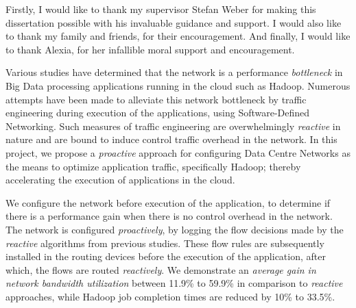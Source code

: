 \documentclass[hidelinks, a4paper, 12pt, oneside]{report}         %
\begin{document}


\thesistitlepage                                  %

\thesisdeclarationpage				  %

\thesispermissionpage				  %


\begin{thesisacknowledgments}                     %
Firstly, I would like to thank my supervisor Stefan Weber for making this dissertation possible with his invaluable guidance and support. I would also like to thank my family and friends, for their encouragement. And finally, I would like to thank Alexia, for her infallible moral support and encouragement.  

\end{thesisacknowledgments}                       %

\begin{thesisabstract}

Various studies have determined that the network is a performance \textit{bottleneck} in Big Data processing applications running in the cloud such as Hadoop. Numerous attempts have been made to alleviate this network bottleneck by traffic engineering during execution of the applications, using Software-Defined Networking. Such measures of traffic engineering are overwhelmingly \textit{reactive} in nature and are bound to induce control traffic overhead in the network. In this project, we propose a \textit{proactive} approach for configuring Data Centre Networks as the means to optimize application traffic, specifically Hadoop; thereby accelerating the execution of applications in the cloud. 

    We configure the network before execution of the application, to determine if there is a performance gain when there is no control overhead in the network. The network is configured \textit{proactively}, by logging the flow decisions made by the \textit{reactive} algorithms from previous studies. These flow rules are subsequently installed in the routing devices before the execution of the application, after which, the flows are routed \textit{reactively}. We demonstrate an \textit{average gain in network bandwidth utilization} between 11.9\% to 59.9\% in comparison to \textit{reactive} approaches, while Hadoop job completion times are reduced by 10\% to 33.5\%.         

\end{thesisabstract}
\end{document}
